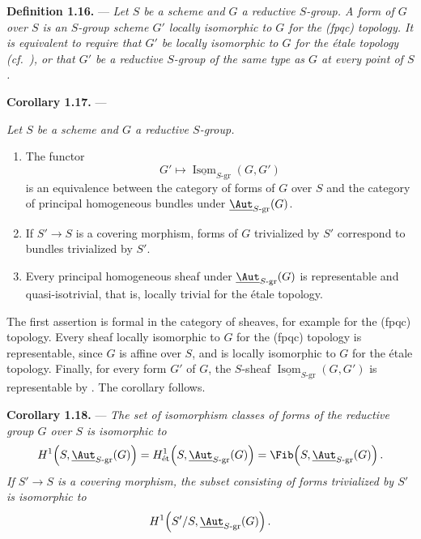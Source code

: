 \medskip\noindent\textbf{Definition 1.16.} ---
{\itshape Let \(S\) be a scheme and \(G\) a reductive \(S\)-group. A
\emph{form of \(G\) over \(S\)} is an \(S\)-group scheme \(G'\)
locally isomorphic to \(G\) for the \textup{(fpqc)} topology. It is
equivalent to require that \(G'\) be locally isomorphic to \(G\) for
the étale topology (cf.\ ), or that \(G'\) be a
reductive \(S\)-group of the same type as \(G\) at every point of
\(S\).}

\medskip\noindent\textbf{Corollary 1.17.} ---
{\itshape Let \(S\) be a scheme and \(G\) a reductive \(S\)-group.
\begin{enumerate}
\item[(i)] The functor
\[
  G'\longmapsto
  \underline{\operatorname{Isom}}_{S\text{-}\mathrm{gr}}(G,G')
\]
is an equivalence between the category of forms of \(G\) over \(S\)
and the category of principal homogeneous bundles under
\(\underline{\Aut}_{S\text{-}\mathrm{gr}}(G)\).
\item[(ii)] If \(S'\to S\) is a covering morphism, forms of \(G\)
trivialized by \(S'\) correspond to bundles trivialized by \(S'\).
\item[\SGAInlineRefTarget{sga3:xxiv:1.17:item:iii}(iii)] Every principal homogeneous sheaf under
\(\underline{\Aut}_{S\text{-}\mathrm{gr}}(G)\) is representable and
quasi-isotrivial, that is, locally trivial for the étale topology.
\end{enumerate}}

The first assertion is formal in the category of sheaves, for example
for the \textup{(fpqc)} topology. Every sheaf locally isomorphic to
\(G\) for the \textup{(fpqc)} topology is representable, since \(G\)
is affine over \(S\), and is locally isomorphic to \(G\) for the
étale topology. Finally, for every form \(G'\) of \(G\), the
\(S\)-sheaf
\(\underline{\operatorname{Isom}}_{S\text{-}\mathrm{gr}}(G,G')\) is
representable by . The corollary follows.

\medskip\noindent\textbf{Corollary 1.18.} ---
{\itshape The set of isomorphism classes of forms of the reductive
group \(G\) over \(S\) is isomorphic to
\[
  H^1\!\left(S,\underline{\Aut}_{S\text{-}\mathrm{gr}}(G)\right)
  =
  H^1_{\mathrm{\acute et}}\!
    \left(S,\underline{\Aut}_{S\text{-}\mathrm{gr}}(G)\right)
  =
  \Fib\!\left(S,\underline{\Aut}_{S\text{-}\mathrm{gr}}(G)\right).
\]
If \(S'\to S\) is a covering morphism, the subset consisting of forms
trivialized by \(S'\) is isomorphic to
\[
  H^1\!\left(S'/S,\underline{\Aut}_{S\text{-}\mathrm{gr}}(G)\right).
\]}

